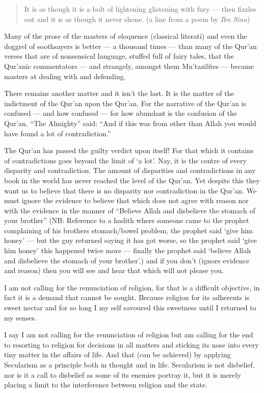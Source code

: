\documentclass[12pt]{book}
\begin{document}
\begin{quote}
It is as though it is a bolt of lightening glistening with fury — then fizzles
out and it is as though it never shone.
(a line from a poem by \emph{Ibn Sina})
\end{quote}

Many of the prose of the masters of eloquence (classical literati) and even the
doggrel of soothsayers is better — a thousand times — than many of the Qur’an
verses that are of nonsensical language, stuffed full of fairy tales, that the
Qur’anic commentators — and strangely, amongst them Mu’tazilites — became
masters at dealing with and defending.

There remains another matter and it isn’t the last. It is the matter of the
indictment of the Qur’an upon the Qur’an. For the narrative of the Qur’an is
confused — and how confused — for how abundant is the confusion of the Qur’an.
“The Almighty” said: “And if this was from other than Allah you would have
found a lot of contradiction.”

The Qur’an has passed the guilty verdict upon itself! For that which it
contains of contradictions goes beyond the limit of ‘a lot’. Nay, it is the
centre of every disparity and contradiction. The amount of disparities and
contradictions in any book in the world has never reached the level of the
Qur’an. Yet despite this they want us to believe that there is no disparity nor
contradiction in the Qur’an. We must ignore the evidence to believe that which
does not agree with reason nor with the evidence in the manner of “Believe
Allah and disbelieve the stomach of your brother”
(NB: Reference to a hadith where someone came to the prophet complaining of his
brothers stomach/bowel problem, the prophet said ‘give him honey’ — but the guy
returned saying it has got worse, so the prophet said ‘give him honey’ this
happened twice more — finally the prophet said ‘believe Allah and disbelieve
the stomach of your brother’.)
and if you don’t (ignore evidence and reason) then you will see and hear that
which will not please you.

I am not calling for the renunciation of religion, for that is a difficult
objective, in fact it is a demand that cannot be sought. Because religion for
its adherents is sweet nectar and for so long I my self savoured this sweetness
until I returned to my senses.

I say I am not calling for the renunciation of religion but am calling for the
end to resorting to religion for decisions in all matters and sticking its nose
into every tiny matter in the affairs of life. And that (can be achieved) by
applying Secularism as a principle both in thought and in life. Secularism is
not disbelief, nor is it a call to disbelief as some of its enemies portray
it, but it is merely placing a limit to the interference between religion and
the state.
\end{document}

